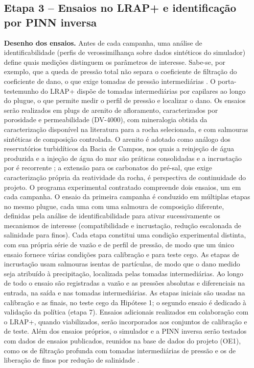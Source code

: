 \documentclass[10pt,a4paper]{article}
\begin{document}
\subsection{Etapa 3 -- Ensaios no LRAP+ e identificação por PINN inversa}
\textbf{Desenho dos ensaios.} Antes de cada campanha, uma análise de identificabilidade
(perfis de verossimilhança sobre dados sintéticos do simulador) define quais medições
distinguem os parâmetros de interesse. Sabe-se, por exemplo, que a queda de pressão total
não separa o coeficiente de filtração do coeficiente de dano, o que exige tomadas de
pressão intermediárias \cite{bedrikovetsky2001}. O porta-testemunho do LRAP+ dispõe de
tomadas intermediárias por capilares ao longo do plugue, o que permite medir o perfil de
pressão e localizar o dano. Os ensaios serão realizados em plugs de arenito de afloramento,
caracterizados por porosidade e permeabilidade (DV-4000), com mineralogia obtida da
caracterização disponível na literatura para a rocha selecionada, e com salmouras sintéticas
de composição controlada. O arenito é adotado como análogo dos reservatórios turbidíticos da Bacia
de Campos, nos quais a reinjeção de água produzida e a injeção de água do mar são práticas
consolidadas e a incrustação por  é recorrente \cite{rocha2001,bezerra2004}; a extensão
para os carbonatos do pré-sal, que exige caracterização própria da reatividade da rocha, é
perspectiva de continuidade do projeto. O programa experimental contratado compreende dois ensaios, um
em cada campanha. O ensaio da primeira campanha é conduzido em múltiplas etapas no mesmo
plugue, cada uma com uma salmoura de composição diferente, definidas pela análise de
identificabilidade para ativar sucessivamente os mecanismos de interesse (compatibilidade e
incrustação, redução escalonada de salinidade para finos). Cada etapa constitui uma condição experimental distinta, com sua própria série de vazão e de perfil de pressão, de modo que um único ensaio fornece várias condições para calibração e para teste cego. As etapas de incrustação usam salmouras isentas de partículas, de modo que o dano medido seja atribuído à precipitação, localizada pelas tomadas intermediárias. Ao longo de todo o ensaio são
registradas a vazão e as pressões absolutas e diferenciais na entrada, na saída e nas
tomadas intermediárias. As etapas iniciais são usadas na calibração e as finais, no teste
cego da Hipótese 1; o segundo ensaio é dedicado à validação da política (etapa 7). Ensaios
adicionais realizados em colaboração com o LRAP+, quando viabilizados, serão incorporados
aos conjuntos de calibração e de teste. Além dos ensaios próprios, o simulador e a PINN inversa serão testados com dados de ensaios publicados, reunidos na base de dados do projeto (OE1), como os de filtração profunda com tomadas intermediárias de pressão \cite{bedrikovetsky2001} e os de liberação de finos por redução de salinidade \cite{khilar1984}.
\end{document}
